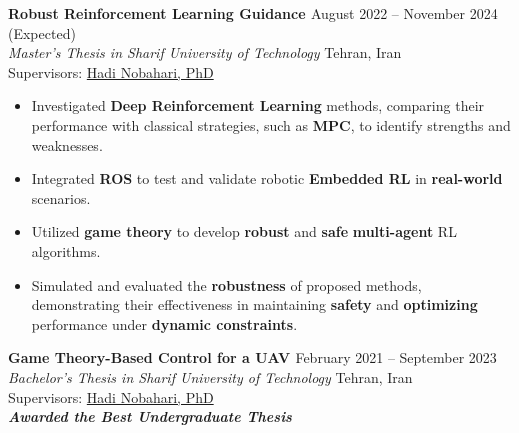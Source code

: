 \documentclass[12pt]{article}
\begin{document}
\vspace{0.2in}
\noindent
{\bfseries  Robust Reinforcement Learning Guidance
\href{https://github.com/CNAVLAB}{\faGithub}
} \hfill August 2022 -- November 2024 (Expected) \\ 
\noindent \textit{Master's Thesis in Sharif University of Technology} \hfill Tehran, Iran \\ 
\noindent Supervisors: 
\href{https://ae.sharif.edu/~portal/faculty/1091235256}{Hadi Nobahari, PhD}

\begin{itemize} %
	\item Investigated \textbf{Deep Reinforcement Learning} methods, comparing their performance with classical strategies, such as \textbf{MPC}, to identify strengths and weaknesses.
	\item Integrated \textbf{ROS} to test and validate robotic \textbf{Embedded RL} in \textbf{real-world} scenarios.
	\item Utilized \textbf{game theory} to develop \textbf{robust} and \textbf{safe} 
	\textbf{multi-agent}
	 RL algorithms.
	\item Simulated and evaluated the \textbf{robustness} of proposed methods, demonstrating their effectiveness in maintaining \textbf{safety} and \textbf{optimizing} performance under \textbf{dynamic constraints}.
\end{itemize}


\vspace{0.2in}
\noindent
{\bfseries Game Theory-Based Control for a UAV 
\href{https://github.com/alibaniasad1999/bachelor-thesis}{\faGithub}
\textcolor{red}{
\href{https://youtu.be/SXZACxGaE1A?si=61yCRB8jFIZlldFG}{\faYoutube}}
} \hfill February 2021 -- September 2023 \\ 
\noindent \textit{Bachelor's Thesis in Sharif University of Technology} \hfill Tehran, Iran \\ 
\noindent Supervisors: 
\href{https://ae.sharif.edu/~portal/faculty/1091235256}{Hadi Nobahari, PhD} \\
{\footnotesize \textbf{\textit{Awarded the Best Undergraduate Thesis \faMedal}}}
\end{document}
